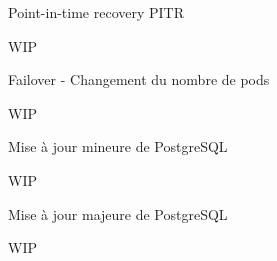 
\begin{frame}[fragile]{Point-in-time recovery PITR}

   WIP

\end{frame}


\begin{frame}[fragile]{Failover - Changement du nombre de pods}

   WIP

\end{frame}


\begin{frame}[fragile]{Mise à jour mineure de PostgreSQL}

   WIP

\end{frame}


\begin{frame}[fragile]{Mise à jour majeure de PostgreSQL}

   WIP

\end{frame}

